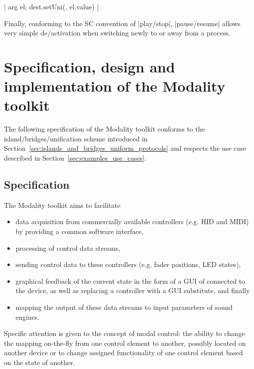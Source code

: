 \documentclass{article}
\begin{document}
|{ arg el; dest.setUni(\amp, el.value) }|

Finally, conforming to the SC convention of |play/stop|, |pause/resume| allows very simple de/activation when switching newly to or away from a process. 


\section{Specification, design and implementation of the Modality toolkit}
\label{sec:implementation}

The following specification of the Modality toolkit conforms to the island/bridges/unification scheme introduced in Section~\ref{sec:islands_and_bridges_uniform_protocols}
and respects the use case described in Section~\ref{sec:examples_use_cases}.

\subsection{Specification}
\label{sub:specification}

The Modality toolkit aims to facilitate
\begin{itemize}\itemsep0em
	\item data acquisition from commercially available controllers (e.g. HID and MIDI) by providing a common software interface,
	\item processing of control data streams,
	\item sending control data to these controllers (e.g. fader positions, LED states),
	\item graphical feedback  of the current state in the form of a GUI of connected to the device, as well as replacing a controller with a GUI substitute, and finally
	\item mapping the output of these data streams to input parameters of sound engines.
\end{itemize}

Specific attention is given to the concept of modal control: the ability to change the mapping on-the-fly from one control element to another, possibly located on another device or to change assigned functionality of one control element based on the state of another.

\end{document}
